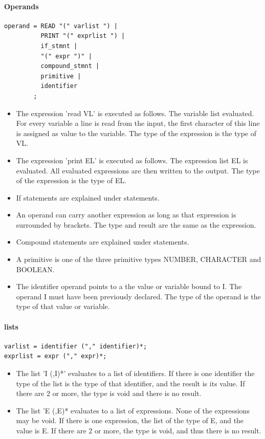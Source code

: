 \documentclass[paper=a4, fontsize=11pt]{article}
\numberwithin{equation}{section}		%
\numberwithin{figure}{section}			%
\numberwithin{table}{section}				%
\begin{document}
\paragraph{Operands}
\begin{verbatim}
operand = READ "(" varlist ") |
	   	  PRINT "(" exprlist ") |
	   	  if_stmnt |
	   	  "(" expr ")" |
	   	  compound_stmnt |
	   	  primitive |
		  identifier
		;
\end{verbatim}

\begin{itemize}
\item The expression 'read VL' is executed as follows. The variable list evaluated. For every variable a line is read from the input, the first character of this line is assigned as value to the variable. The type of the expression is the type of VL.
\item The expression 'print EL' is executed as follows. The expression list EL is evaluated. All evaluated expressions are then written to the output. The type of the expression is the type of EL.
\item If statements are explained under statements.
\item An operand can carry another expression as long as that expression is surrounded by brackets. The type and result are the same as the expression.
\item Compound statements are explained under statements.
\item A primitive is one of the three primitive types NUMBER, CHARACTER and BOOLEAN.
\item The identifier operand points to a the value or variable bound to I. The operand I must have been previously declared. The type of the operand is the type of that value or variable.
\end{itemize}

\paragraph{lists}
\begin{verbatim}
varlist = identifier ("," identifier)*;
exprlist = expr ("," expr)*;
\end{verbatim}
\begin{itemize}
\item The list 'I (,I)*' evaluates to a list of identifiers. If there is one identifier the type of the list is the type of that identifier, and the result is its value. If there are 2 or more, the type is void and there is no result.
\item The list 'E (,E)* evaluates to a list of expressions. None of the expressions may be void. If there is one expression, the list of the type of E, and the value is E. If there are 2 or more, the type is void, and thus there is no result.
\end{itemize}
\end{document}
